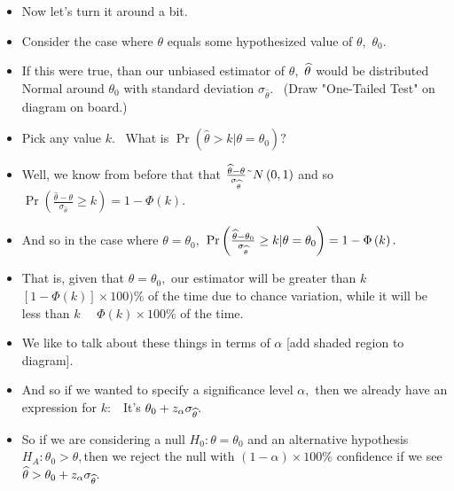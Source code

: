 \documentclass[11pt]{article}
\begin{document}
\begin{itemize}
\item Now let's turn it around a bit.

\item Consider the case where $\theta $ equals some hypothesized value of $%
\theta ,$ $\theta _{0}.$

\item If this were true, than our unbiased estimator of $\theta ,$ $\widehat{%
\theta }$ would be distributed Normal around $\theta _{0}$ with standard
deviation $\sigma _{\widehat{\theta }}.$ \ (Draw "One-Tailed Test" on
diagram on board.)

\item Pick any value $k.$ \ What is $\Pr (\widehat{\theta }>k|\theta =\theta
_{0})?$ \ 

\item Well, we know from before that that $\frac{\widehat{\theta }-\theta }{%
\sigma _{\widehat{\theta }}}\symbol{126}N\left( 0,1\right) $ and so $\Pr
\left( \frac{\widehat{\theta }-\theta }{\sigma _{\widehat{\theta }}}\geq
k\right) =1-\Phi \left( k\right) .$

\item And so in the case where $\theta =\theta _{0},$ $\Pr \left( \frac{%
\widehat{\theta }-\theta _{0}}{\sigma _{\widehat{\theta }}}\geq k|\theta
=\theta _{0}\right) =1-\Phi \left( k\right) .$

\item That is, given that $\theta =\theta _{0},$ our estimator will be
greater than $k$ \ $\left[ 1-\Phi \left( k\right) \right] \times 100)\%$ of
the time due to chance variation, while it will be less than $k$ \ \ $\Phi
\left( k\right) \times 100\%$ of the time.

\item We like to talk about these things in terms of $\alpha $ [add shaded
region to diagram].

\item And so if we wanted to specify a significance level $\alpha ,$ then we
already have an expression for $k:$ \ It's $\theta _{0}+z_{\alpha }\sigma _{%
\widehat{\theta }}.$

\item So if we are considering a null $H_{0}:\theta =\theta _{0}$ and an
alternative hypothesis $H_{A}:\theta _{0}>\theta ,$then we reject the null
with $\left( 1-\alpha \right) \times 100\%$ confidence if we see $\widehat{%
\theta }>\theta _{0}+z_{\alpha }\sigma _{\widehat{\theta }}.$ \ 


\end{itemize}
\end{document}
